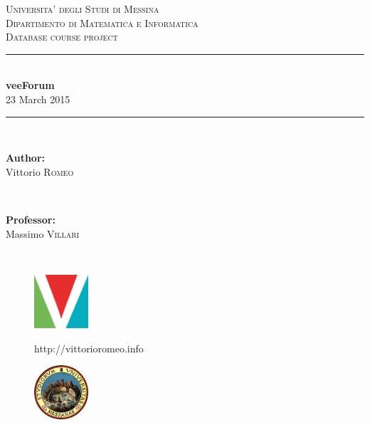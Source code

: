 \documentclass[12pt]{report}
\newcommand{\HRule}{\rule{\linewidth}{0.5mm}}
\renewcommand\emph{\textbf}
\begin{document}
    \begin{titlepage}

        \center

        \textsc{\LARGE Universita' degli Studi di Messina}\\[0.1cm]
        \textsc{\Large Dipartimento di Matematica e Informatica}\\[0.5cm]
        \textsc{\Large Database course project}\\[0.5cm]

        \HRule \\[0.4cm]
        { \huge \bfseries veeForum}\\[0.1cm]

        {\large 23 March 2015}
        \HRule \\[1.5cm]

        \begin{minipage}{0.4\textwidth}
        \begin{flushleft} \large
        \emph{Author:}\\
        Vittorio \textsc{Romeo} %
        \end{flushleft}
        \end{minipage}
        ~
        \begin{minipage}{0.4\textwidth}
        \begin{flushright} \large
        \emph{Professor:} \\
        Massimo \textsc{Villari}


        \end{flushright}
        \end{minipage}\\[4cm]

        \vfill

        \begin{minipage}{\linewidth}
            \centering
            \begin{minipage}{0.35\linewidth}
                \begin{figure}[H]
                    \center
                    \includegraphics[width=2cm, height=2cm]{logovee}

                    http://vittorioromeo.info
                \end{figure}
            \end{minipage}
            \hspace{0.27\linewidth}
            \begin{minipage}{0.35\linewidth}
                \begin{figure}[H]
                    \center
                    \includegraphics[width=2cm, height=2cm]{logounime}


\end{figure}
\end{minipage}
\end{minipage}
\end{titlepage}
\end{document}
